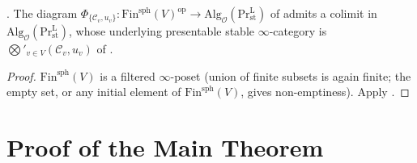 \begin{corollary}
\label{v4-arith:tate:cor:rtp-as-colimit-in-alg}
\ClaimStatusProvedHere. The diagram
\(\Phi_{\{\mathcal{C}_{v},u_{v}\}}:\mathrm{Fin}^{\mathrm{sph}}(V)^{\mathrm{op}}\to\mathrm{Alg}_{\mathcal{O}}(\mathrm{Pr}^{\mathrm{L}}_{\mathrm{st}})\)
of
 admits a colimit in
\(\mathrm{Alg}_{\mathcal{O}}(\mathrm{Pr}^{\mathrm{L}}_{\mathrm{st}})\),
whose underlying presentable stable \(\infty\)-category is
\(\bigotimes'_{v\in V}(\mathcal{C}_{v},u_{v})\) of
.
\end{corollary}

\begin{proof}
\(\mathrm{Fin}^{\mathrm{sph}}(V)\) is a filtered \(\infty\)-poset
(union of finite subsets is again finite; the empty set, or any
initial element of \(\mathrm{Fin}^{\mathrm{sph}}(V)\), gives
non-emptiness). Apply
.
\end{proof}

\section{Proof of the Main Theorem}
\label{v4-arith:tate:main-proof}

